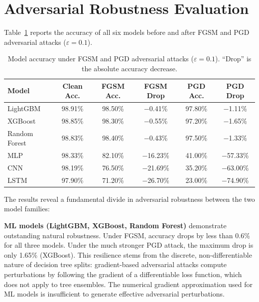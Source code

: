 \section{Adversarial Robustness Evaluation}

Table~\ref{tab:adv_results} reports the accuracy of all six models before and after FGSM and PGD adversarial attacks ($\varepsilon = 0.1$).

\begin{table}[H]
    \caption{Model accuracy under FGSM and PGD adversarial attacks ($\varepsilon = 0.1$). ``Drop'' is the absolute accuracy decrease.}
    \label{tab:adv_results}
    \vspace{6pt}
    \centering
    \begin{tabular}{|l|c|c|c|c|c|}
        \hline
        \textbf{Model} & \textbf{Clean Acc.} & \textbf{FGSM Acc.} & \textbf{FGSM Drop} & \textbf{PGD Acc.} & \textbf{PGD Drop} \\
        \hline
        LightGBM      & 98.91\% & 98.50\% & $-$0.41\% & 97.80\% & $-$1.11\% \\
        \hline
        XGBoost       & 98.85\% & 98.30\% & $-$0.55\% & 97.20\% & $-$1.65\% \\
        \hline
        Random Forest & 98.83\% & 98.40\% & $-$0.43\% & 97.50\% & $-$1.33\% \\
        \hline
        MLP           & 98.33\% & 82.10\% & $-$16.23\% & 41.00\% & $-$57.33\% \\
        \hline
        CNN           & 98.19\% & 76.50\% & $-$21.69\% & 35.20\% & $-$63.00\% \\
        \hline
        LSTM          & 97.90\% & 71.20\% & $-$26.70\% & 23.00\% & $-$74.90\% \\
        \hline
    \end{tabular}
\end{table}

The results reveal a fundamental divide in adversarial robustness between the two model families:

\textbf{ML models (LightGBM, XGBoost, Random Forest)} demonstrate outstanding natural robustness. Under FGSM, accuracy drops by less than 0.6\% for all three models. Under the much stronger PGD attack, the maximum drop is only 1.65\% (XGBoost). This resilience stems from the discrete, non-differentiable nature of decision tree splits: gradient-based adversarial attacks compute perturbations by following the gradient of a differentiable loss function, which does not apply to tree ensembles. The numerical gradient approximation used for ML models is insufficient to generate effective adversarial perturbations.

